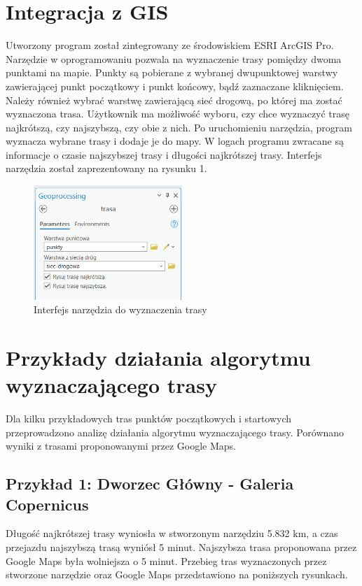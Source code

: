 \documentclass{article}
\begin{document}
\section{Integracja z GIS}
Utworzony program został zintegrowany ze środowiskiem ESRI ArcGIS Pro. Narzędzie w oprogramowaniu pozwala na wyznaczenie trasy pomiędzy dwoma punktami na mapie. 
Punkty są pobierane z wybranej dwupunktowej warstwy zawierającej punkt początkowy i punkt końcowy, bądź zaznaczane kliknięciem. Należy również wybrać warstwę zawierającą sieć drogową, po której ma zostać wyznaczona trasa. Użytkownik ma możliwość wyboru, czy chce wyznaczyć trasę najkrótszą, czy najszybszą, czy obie z nich. Po uruchomieniu narzędzia, program wyznacza wybrane trasy i dodaje je do mapy. W logach programu zwracane są informacje o czasie najszybszej trasy i długości najkrótszej trasy. Interfejs narzędzia został zaprezentowany na rysunku 1.

\begin{figure}[H]
    \centering
    \includegraphics[width=0.5\textwidth]{img/narzedzie-interfejs-trasa.png}
    \caption{Interfejs narzędzia do wyznaczenia trasy}
\end{figure}

\section{Przykłady działania algorytmu wyznaczającego trasy}
Dla kilku przykładowych tras punktów początkowych i startowych przeprowadzono analizę działania algorytmu wyznaczającego trasy. Porównano wyniki z trasami proponowanymi przez Google Maps.

\subsection{Przykład 1: Dworzec Główny - Galeria Copernicus}
Długość najkrótszej trasy wyniosła w stworzonym narzędziu 5.832 km, a czas przejazdu najszybszą trasą wyniósł 5 minut. Najszybsza trasa proponowana przez Google Maps była wolniejsza o 5 minut. 
Przebieg tras wyznaczonych przez stworzone narzędzie oraz Google Maps przedstawiono na poniższych rysunkach.
\end{document}
